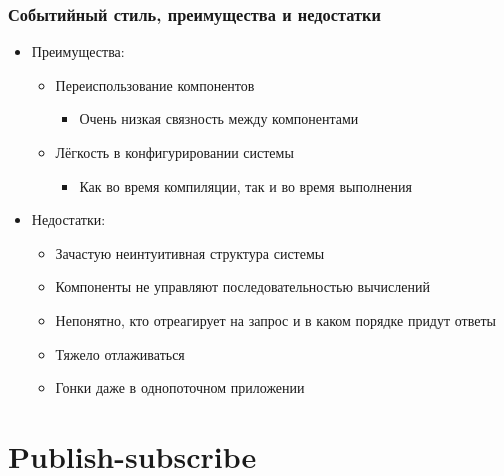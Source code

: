 \documentclass{../cscslides}
\begin{document}
    \begin{frame}
        \frametitle{Событийный стиль, преимущества и недостатки}
        \begin{itemize}
            \item Преимущества:
            \begin{itemize}
                \item Переиспользование компонентов
                \begin{itemize}
                    \item Очень низкая связность между компонентами
                \end{itemize}
                \item Лёгкость в конфигурировании системы
                \begin{itemize}
                    \item Как во время компиляции, так и во время выполнения
                \end{itemize}
            \end{itemize}
            \item Недостатки:
            \begin{itemize}
                \item Зачастую неинтуитивная структура системы
                \item Компоненты не управляют последовательностью вычислений
                \item Непонятно, кто отреагирует на запрос и в каком порядке придут ответы
                \item Тяжело отлаживаться
                \item Гонки даже в однопоточном приложении
            \end{itemize}
        \end{itemize}
    \end{frame}

    \section{Publish-subscribe}
\end{document}
